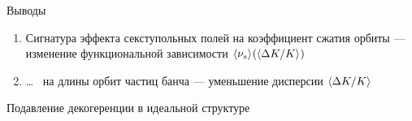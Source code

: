 \documentclass[14pt]{beamer}
\begin{document}
\begin{frame}{Выводы}
	\begin{enumerate}[<+->]
		\item Сигнатура эффекта секступольных полей на коэффициент сжатия орбиты --- изменение функциональной зависимости $\avg{\nu_s}(\avg{\Delta K/K})$
		\item \ldots~ на длины орбит частиц банча --- уменьшение дисперсии $\avg{\Delta K/K}$
	\end{enumerate}
\end{frame}
\begin{frame}{Подавление декогеренции в идеальной структуре}\centering
\end{frame}
\end{document}
